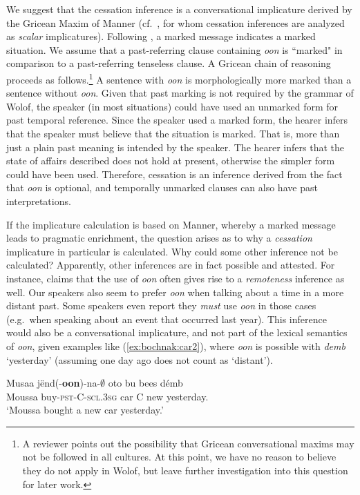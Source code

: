 \documentclass[output=paper,newtxmath,modfonts,nonflat,draftmode]{langsci/langscibook}
\begin{document}
We suggest that the cessation inference is a conversational implicature derived by the Gricean Maxim of Manner (cf.~\citealt{altshuler12moment, Cable2017a}, for whom cessation inferences are analyzed as \textit{scalar} implicatures). Following \citet{levinson00presumptive}, a marked message indicates a marked situation. We assume that a past-referring clause containing \textit{oon} is ``marked" in comparison to a past-referring tenseless clause. A Gricean chain of reasoning proceeds as follows.\footnote{A reviewer points out the possibility that Gricean conversational maxims may not be followed in all cultures. At this point, we have no reason to believe they do not apply in Wolof, but leave further investigation into this question for later work.} A sentence with \textit{oon} is morphologically more marked than a sentence without \textit{oon}. Given that past marking is not required by the grammar of Wolof, the speaker (in most situations) could have used an unmarked form for past temporal reference. Since the speaker used a marked form, the hearer infers that the speaker must believe that the situation is marked. That is, more than just a plain past meaning is intended by the speaker. The hearer infers that the state of affairs described does not hold at present, otherwise the simpler form could have been used. Therefore, cessation is an inference derived from the fact that \textit{oon} is optional, and temporally unmarked clauses can also have past interpretations. 

If the implicature calculation is based on Manner, whereby a marked message leads to pragmatic enrichment, the question arises as to why a \textit{cessation} implicature in particular is calculated. Why  could some other inference not be calculated? Apparently, other inferences are in fact possible and attested. For instance, \citet{church81systeme} claims that the use of \textit{oon}
often gives rise to a \textit{remoteness} inference as well. Our speakers also seem to prefer \textit{oon} when talking about a time in a more distant past. Some speakers even report they \textit{must} use \textit{oon} in those cases (e.g.~when speaking about an event that occurred last year). This inference would also be a conversational implicature, and not part of the lexical semantics of \textit{oon}, given examples like (\ref{ex:bochnak:car2}), where \textit{oon} is possible with \textit{demb} `yesterday' (assuming one day ago does not count as `distant').

\ea\label{ex:bochnak:car2}
\gll Musaa j\"end(-\textbf{oon})-na-$\emptyset$ oto bu bees d\'emb \\
Moussa buy\textsc{-pst-C-scl.3sg} car C new yesterday. \\
\glt `Moussa bought a new car yesterday.'
\z
\end{document}
